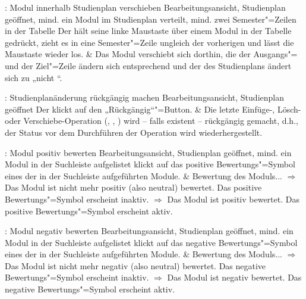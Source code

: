 \begin{usecase}{: Modul innerhalb Studienplan verschieben}
	{Bearbeitungsansicht, \gls{Studienplan} geöffnet, mind. ein \gls{Modul} im Studienplan verteilt, mind. zwei Semester"=Zeilen in der Tabelle}
	Der  hält seine linke Maustaste über einem Modul in der Tabelle gedrückt, zieht es in eine Semester"=Zeile ungleich der vorherigen und lässt die Maustaste wieder los.
	& Das Modul verschiebt sich dorthin, die  der Ausgangs"= und der Ziel"=Zeile ändern sich entsprechend und der  des Studienplans ändert sich zu „nicht “.
\end{usecase}

\begin{usecase}{: Studienplanänderung rückgängig machen\opt}
	{Bearbeitungsansicht, \gls{Studienplan} geöffnet}
	Der  klickt auf den „Rückgängig“"=Button.
	& Die letzte Einfüge-, Lösch- oder Verschiebe-Operation (, , ) wird – falls existent – rückgängig gemacht, d.h., der Status vor dem Durchführen der Operation wird wiederhergestellt.
\end{usecase}

\begin{usecase}{: Modul positiv bewerten}
	{Bearbeitungsansicht, \gls{Studienplan} geöffnet, mind. ein \gls{Modul} in der Suchleiste aufgelistet}
	 klickt auf das positive Bewertungs"=Symbol eines der in der Suchleiste aufgeführten Module.
	& Bewertung des Moduls... \newline
	 $\Rightarrow$ Das Modul ist nicht mehr positiv (also neutral) bewertet. Das positive Bewertungs"=Symbol erscheint inaktiv. \newline
	 $\Rightarrow$ Das Modul ist positiv bewertet. Das positive Bewertungs"=Symbol erscheint aktiv.
\end{usecase}

\begin{usecase}{: Modul negativ bewerten}
	{Bearbeitungsansicht, \gls{Studienplan} geöffnet, mind. ein \gls{Modul} in der Suchleiste aufgelistet}
	 klickt auf das negative Bewertungs"=Symbol eines der in der Suchleiste aufgeführten Module.
	& Bewertung des Moduls... \newline
	 $\Rightarrow$ Das Modul ist nicht mehr negativ (also neutral) bewertet. Das negative Bewertungs"=Symbol erscheint inaktiv. \newline
	 $\Rightarrow$ Das Modul ist negativ bewertet. Das negative Bewertungs"=Symbol erscheint aktiv.
\end{usecase}

